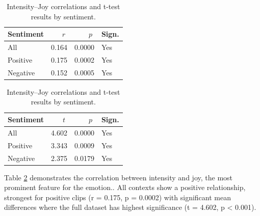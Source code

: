   
  
  \begin{table}[H]
    \centering
  
    \begin{subtable}{0.45\textwidth}
      \centering
      \caption{Intensity and Joy (r)}\label{tab:rq1_corr_intensity_joy}
      \begin{tabular}{l r r l}
        \toprule
        Sentiment & \(\;r\;\) & \(\;p\;\) & Sign. \\
        \midrule
        All        & 0.164        & 0.0000    & Yes         \\
        Positive   & 0.175        & 0.0002    & Yes         \\
        Negative   & 0.152        & 0.0005    & Yes         \\
        \bottomrule
      \end{tabular}
    \end{subtable}\hfill
    \begin{subtable}{0.45\textwidth}
      \centering
      \caption{Intensity and Joy (t-test)}\label{tab:rq1_ttest_intensity_joy}
      \begin{tabular}{l r r l}
        \toprule
        Sentiment & \(\;t\;\) & \(\;p\;\) & Sign. \\
        \midrule
        All        & 4.602        & 0.0000    & Yes         \\
        Positive   & 3.343        & 0.0009    & Yes         \\
        Negative   & 2.375        & 0.0179    & Yes         \\

        \bottomrule
      \end{tabular}
    \end{subtable}
  
    \caption{Intensity–Joy correlations and t-test results by sentiment.}
    \label{tab:rq1_intensity_joy_side_by_side}
  \end{table}
Table \ref{tab:rq1_intensity_joy_side_by_side} demonstrates the correlation between intensity and joy, the most prominent feature for the emotion.. 
All contexts show a positive relationship, strongest for positive clips (r = 0.175, p = 0.0002) with significant mean differences where the full dataset has highest significance (t = 4.602, p < 0.001). 
